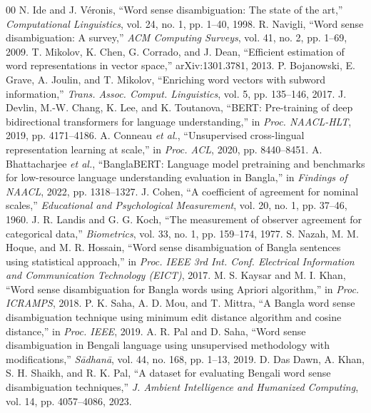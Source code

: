 \documentclass[conference]{IEEEtran}
\begin{document}
\begin{thebibliography}{00}
 N. Ide and J. V\'eronis, ``Word sense disambiguation: The state of the art,'' \textit{Computational Linguistics}, vol. 24, no. 1, pp. 1--40, 1998.
 R. Navigli, ``Word sense disambiguation: A survey,'' \textit{ACM Computing Surveys}, vol. 41, no. 2, pp. 1--69, 2009.
 T. Mikolov, K. Chen, G. Corrado, and J. Dean, ``Efficient estimation of word representations in vector space,'' arXiv:1301.3781, 2013.
 P. Bojanowski, E. Grave, A. Joulin, and T. Mikolov, ``Enriching word vectors with subword information,'' \textit{Trans. Assoc. Comput. Linguistics}, vol. 5, pp. 135--146, 2017.
 J. Devlin, M.-W. Chang, K. Lee, and K. Toutanova, ``BERT: Pre-training of deep bidirectional transformers for language understanding,'' in \textit{Proc. NAACL-HLT}, 2019, pp. 4171--4186.
 A. Conneau \emph{et al.}, ``Unsupervised cross-lingual representation learning at scale,'' in \textit{Proc. ACL}, 2020, pp. 8440--8451.
 A. Bhattacharjee \emph{et al.}, ``BanglaBERT: Language model pretraining and benchmarks for low-resource language understanding evaluation in Bangla,'' in \textit{Findings of NAACL}, 2022, pp. 1318--1327.
 J. Cohen, ``A coefficient of agreement for nominal scales,'' \textit{Educational and Psychological Measurement}, vol. 20, no. 1, pp. 37--46, 1960.
 J. R. Landis and G. G. Koch, ``The measurement of observer agreement for categorical data,'' \textit{Biometrics}, vol. 33, no. 1, pp. 159--174, 1977.
 S. Nazah, M. M. Hoque, and M. R. Hossain, ``Word sense disambiguation of Bangla sentences using statistical approach,'' in \textit{Proc. IEEE 3rd Int. Conf. Electrical Information and Communication Technology (EICT)}, 2017.
 M. S. Kaysar and M. I. Khan, ``Word sense disambiguation for Bangla words using Apriori algorithm,'' in \textit{Proc. ICRAMPS}, 2018.
 P. K. Saha, A. D. Mou, and T. Mittra, ``A Bangla word sense disambiguation technique using minimum edit distance algorithm and cosine distance,'' in \textit{Proc. IEEE}, 2019.
 A. R. Pal and D. Saha, ``Word sense disambiguation in Bengali language using unsupervised methodology with modifications,'' \textit{S\=adhan\=a}, vol. 44, no. 168, pp. 1--13, 2019.
 D. Das Dawn, A. Khan, S. H. Shaikh, and R. K. Pal, ``A dataset for evaluating Bengali word sense disambiguation techniques,'' \textit{J. Ambient Intelligence and Humanized Computing}, vol. 14, pp. 4057--4086, 2023.
\end{thebibliography}
\end{document}
